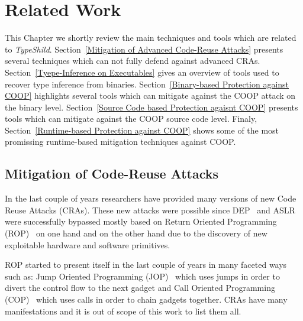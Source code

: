 \chapter{Related Work}
\label{chapter:Related_Work}
This Chapter we shortly review the main techniques and tools which are related 
to \textit{TypeShild}. 
Section~\ref{Mitigation of Advanced Code-Reuse Attacks} presents 
several techniques which can not fully defend against advanced CRAs.
Section~\ref{Tyepe-Inference on Executables} gives an overview of tools used to
recover type inference from binaries.
Section~\ref{Binary-based Protection against COOP} highlights several tools which can
mitigate against the COOP attack on the binary level.
Section~\ref{Source Code based Protection agaisnt COOP} presents tools which can
mitigate against the COOP source code level.
Finaly, Section~\ref{Runtime-based Protection against COOP} shows some of the most promissing 
runtime-based mitigation techniques against COOP.

\section{Mitigation of Code-Reuse Attacks}
\label{Code-Reuse Attacks}
In the last couple of years researchers have provided many versions of new Code Reuse Attacks (CRAs).
These new attacks were possible since DEP~\cite{dep} and ASLR~\cite{ASLR} were successfully bypassed mostly based
on Return Oriented Programming (ROP)~\cite{ROP, kornau:rop, rop:shacham} on one hand and on 
the other hand due to the discovery of new exploitable hardware and software primitives.

ROP started to present itself in the last couple of years in many faceted ways such as:
Jump Oriented Programming (JOP)~\cite{JOP1, JOP2, JOP3} which uses jumps in order to divert the control flow to the next gadget and 
Call Oriented Programming (COP)~\cite{rop:carlini} which uses calls in order to chain gadgets together.
CRAs have many manifestations and it is out of scope of this work to list them all.

